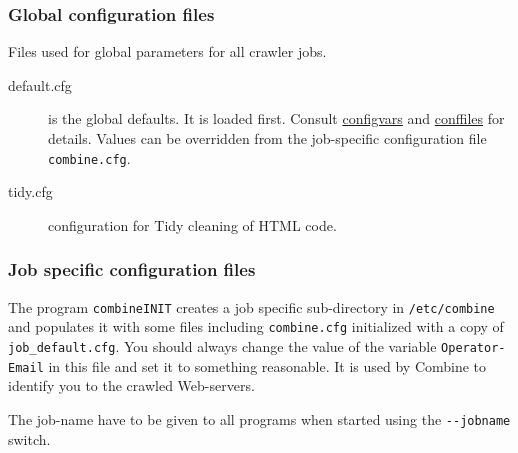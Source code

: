 \subsubsection{Global configuration files}
Files used for global parameters for all crawler jobs.
\begin{description}

\item[default.cfg] is the global defaults. It is loaded first.
Consult \hyperref{'Configuration Variables'}{section }{}{configvars}
and \hyperref{'Default configuration files'}{appendix }{}{conffiles} for details.
Values can be overridden from
the job-specific configuration file {\tt combine.cfg}.

\item[tidy.cfg] configuration for Tidy cleaning of HTML code.

\end{description}

\subsubsection{Job specific configuration files}
The program {\tt combineINIT} creates
a job specific sub-directory in {\tt /etc/combine} and populates it with some files including {\tt combine.cfg}
initialized with a copy of {\tt job\_default.cfg}.
You should always change the value of the variable {\tt Operator-Email} 
in this file and set it to something
reasonable. It is used by Combine to identify you to the crawled Web-servers.

The job-name have to be given to all programs
when started using the \verb+--jobname+ switch. 

